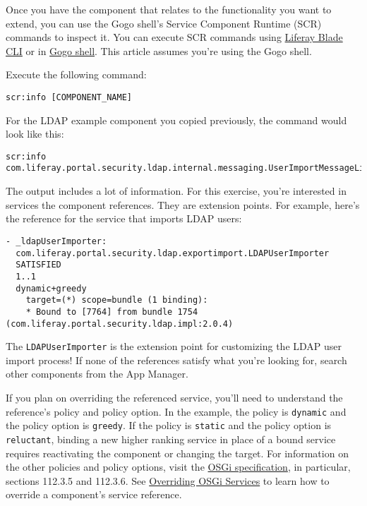 Once you have the component that relates to the functionality you want
to extend, you can use the Gogo shell's Service Component Runtime (SCR)
commands to inspect it. You can execute SCR commands using
\href{/docs/7-2/reference/-/knowledge_base/r/blade-cli}{Liferay Blade
CLI} or in
\href{/docs/7-2/customization/-/knowledge_base/c/using-the-felix-gogo-shell}{Gogo
shell}. This article assumes you're using the Gogo shell.

Execute the following command:

\begin{verbatim}
scr:info [COMPONENT_NAME]
\end{verbatim}

For the LDAP example component you copied previously, the command would
look like this:

\begin{verbatim}
scr:info com.liferay.portal.security.ldap.internal.messaging.UserImportMessageListener
\end{verbatim}

The output includes a lot of information. For this exercise, you're
interested in services the component references. They are extension
points. For example, here's the reference for the service that imports
LDAP users:

\begin{verbatim}
- _ldapUserImporter: 
  com.liferay.portal.security.ldap.exportimport.LDAPUserImporter 
  SATISFIED 
  1..1 
  dynamic+greedy
    target=(*) scope=bundle (1 binding):
    * Bound to [7764] from bundle 1754 (com.liferay.portal.security.ldap.impl:2.0.4)
\end{verbatim}

The \texttt{LDAPUserImporter} is the extension point for customizing the
LDAP user import process! If none of the references satisfy what you're
looking for, search other components from the App Manager.

If you plan on overriding the referenced service, you'll need to
understand the reference's policy and policy option. In the example, the
policy is \texttt{dynamic} and the policy option is \texttt{greedy}. If
the policy is \texttt{static} and the policy option is
\texttt{reluctant}, binding a new higher ranking service in place of a
bound service requires reactivating the component or changing the
target. For information on the other policies and policy options, visit
the \href{https://osgi.org/download/r6/osgi.enterprise-6.0.0.pdf}{OSGi
specification}, in particular, sections 112.3.5 and 112.3.6. See
\href{/docs/7-2/customization/-/knowledge_base/c/overriding-osgi-services}{Overriding
OSGi Services} to learn how to override a component's service reference.

